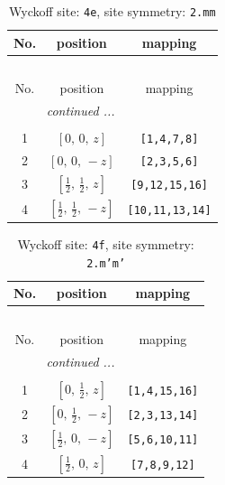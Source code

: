 \documentclass[fleqn,8pt]{jsarticle}
\begin{document}
\begin{longtable}{ccc}
\caption{Wyckoff site: {\tt 4e}, site symmetry: {\tt 2.mm}}
 \\
 \hline \hline
No. & position & mapping \\ \hline \endfirsthead

\multicolumn{2}{l}{\tablename\ \thetable{}} \\
 \hline \hline
No. & position & mapping \\ \hline \endhead

 \hline \hline
\multicolumn{2}{r}{\footnotesize\it continued ...} \\ \endfoot

 \hline \hline
\multicolumn{2}{r}{} \\ \endlastfoot

1 & $\left[ 0,\, 0,\, z \right]$ & {\tt [1,4,7,8]} \\ \hline
2 & $\left[ 0,\, 0,\, - z \right]$ & {\tt [2,3,5,6]} \\ \hline
3 & $\left[ \frac{1}{2},\, \frac{1}{2},\, z \right]$ & {\tt [9,12,15,16]} \\ \hline
4 & $\left[ \frac{1}{2},\, \frac{1}{2},\, - z \right]$ & {\tt [10,11,13,14]} \\
\end{longtable}
\renewcommand{\arraystretch}{1.2}
\begin{longtable}{ccc}
\caption{Wyckoff site: {\tt 4f}, site symmetry: {\tt 2.m'm'}}
 \\
 \hline \hline
No. & position & mapping \\ \hline \endfirsthead

\multicolumn{2}{l}{\tablename\ \thetable{}} \\
 \hline \hline
No. & position & mapping \\ \hline \endhead

 \hline \hline
\multicolumn{2}{r}{\footnotesize\it continued ...} \\ \endfoot

 \hline \hline
\multicolumn{2}{r}{} \\ \endlastfoot

1 & $\left[ 0,\, \frac{1}{2},\, z \right]$ & {\tt [1,4,15,16]} \\ \hline
2 & $\left[ 0,\, \frac{1}{2},\, - z \right]$ & {\tt [2,3,13,14]} \\ \hline
3 & $\left[ \frac{1}{2},\, 0,\, - z \right]$ & {\tt [5,6,10,11]} \\ \hline
4 & $\left[ \frac{1}{2},\, 0,\, z \right]$ & {\tt [7,8,9,12]} \\
\end{longtable}
\end{document}
